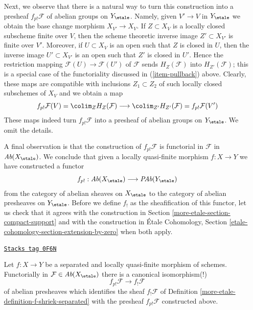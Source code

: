 \medskip\noindent
Next, we observe that there is a natural way to turn this construction
into a presheaf $f_{p!}\mathcal{F}$ of abelian groups on $Y_\etale$.
Namely, given $V' \to V$ in $Y_\etale$ we obtain the base change morphism
$X_{V'} \to X_V$. If $Z \subset X_V$ is a locally closed subscheme
finite over $V$, then the scheme theoretic inverse image $Z' \subset X_{V'}$
is finite over $V'$. Moreover, if $U \subset X_V$ is an open such
that $Z$ is closed in $U$, then the inverse image $U' \subset X_{V'}$
is an open such that $Z'$ is closed in $U'$. Hence the restriction
mapping $\mathcal{F}(U) \to \mathcal{F}(U')$ of $\mathcal{F}$
sends $H_Z(\mathcal{F})$ into $H_{Z'}(\mathcal{F})$; this is a special
case of the functoriality discussed in (\ref{item-pullback}) above.
Clearly, these maps are compatible with inclusions
$Z_1 \subset Z_2$ of such locally closed subschemes of $X_V$ and
we obtain a map
$$
f_{p!}\mathcal{F}(V) = \colim_Z H_Z(\mathcal{F})
\longrightarrow
\colim_{Z'} H_{Z'}(\mathcal{F}) =
f_{p!}\mathcal{F}(V')
$$
These maps indeed turn $f_{p!}\mathcal{F}$ into a presheaf of abelian
groups on $Y_\etale$. We omit the details.

\medskip\noindent
A final observation is that the construction of $f_{p!}\mathcal{F}$
is functorial in $\mathcal{F}$ in $\textit{Ab}(X_\etale)$.
We conclude that given a locally quasi-finite morphism $f : X \to Y$
we have constructed a functor
$$
f_{p!} :
\textit{Ab}(X_\etale)
\longrightarrow
\textit{PAb}(Y_\etale)
$$
from the category of abelian sheaves on $X_\etale$ to the category
of abelian presheaves on $Y_\etale$. Before we define $f_!$ as the
sheafification of this functor, let us check that it agrees with
the construction in Section \ref{more-etale-section-compact-support}
and with the construction in
\'Etale Cohomology, Section \ref{etale-cohomology-section-extension-by-zero}
when both apply.

\begin{lemma}
\label{more-etale-lemma-finite-support-f-shriek-separated}
\href{https://stacks.math.columbia.edu/tag/0F6N}{\texttt{Stacks tag 0F6N}}

Let $f : X \to Y$ be a separated and locally quasi-finite morphism
of schemes. Functorially in $\mathcal{F} \in \textit{Ab}(X_\etale)$
there is a canonical isomorphism(!)
$$
f_{p!}\mathcal{F} \longrightarrow f_!\mathcal{F}
$$
of abelian presheaves which identifies the sheaf
$f_!\mathcal{F}$ of Definition \ref{more-etale-definition-f-shriek-separated}
with the presheaf $f_{p!}\mathcal{F}$ constructed above.
\end{lemma}

